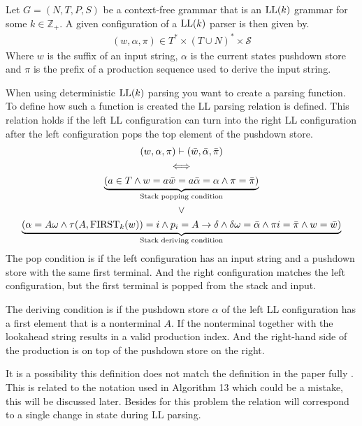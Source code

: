 \begin{definition}
    \label{def:ll-configuration}
    Let $G = (N, T, P, S)$ be a context-free grammar that is an $\text{LL}(k)$ grammar for some $k \in \mathbb{Z}_+$. A given configuration \cite[p. 5]{Vagner2007} of a $\text{LL}(k)$ parser is then given by.
    \begin{align*}
        (w, \alpha, \pi) \in T^* \times (T \cup N)^* \times \mathcal{S}
    \end{align*}
    Where $w$ is the suffix of an input string, $\alpha$ is the current states pushdown store and $\pi$ is the prefix of a production sequence used to derive the input string.
\end{definition}
\noindent When using deterministic $\text{LL}(k)$ parsing you want to create a parsing function. To define how such a function is created the LL parsing relation is defined. This relation holds if the left LL configuration can turn into the right LL configuration after the left configuration pops the top element of the pushdown store.
\begin{gather*}
    (w, \alpha, \pi) \vdash (\bar{w}, \bar{\alpha}, \bar{\pi}) \\
    \iff \\
    \underbrace{(a \in T \land w = a\bar{w} = a\bar{\alpha} = \alpha \land \pi = \bar{\pi})}_{\text{Stack popping condition}} \\
    \lor \\
    \underbrace{\left(\alpha = A\omega \land \tau(A, \text{FIRST}_k(w)) = i \land p_i = A \to \delta \land \delta\omega = \bar{\alpha} \land \pi i = \bar{\pi} \land w = \bar{w}\right)}_{\text{Stack deriving condition}}
\end{gather*}
The pop condition is if the left configuration has an input string and a pushdown store with the same first terminal. And the right configuration matches the left configuration, but the first terminal is popped from the stack and input.

The deriving condition is if the pushdown store $\alpha$ of the left LL configuration has a first element that is a nonterminal $A$. If the nonterminal together with the lookahead string results in a valid production index. And the right-hand side of the production is on top of the pushdown store on the right.

It is a possibility this definition does not match the definition in the paper fully \cite[6]{Vagner2007}. This is related to the notation used in Algorithm 13 \cite[15]{Vagner2007} which could be a mistake, this will be discussed later. Besides for this problem the relation will correspond to a single change in state during LL parsing.

